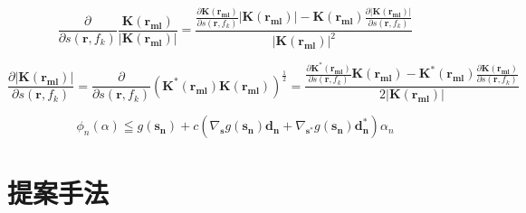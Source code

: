 \documentclass[12pt,a4paper]{jsreport}
\begin{document}

  \begin{equation}
    \frac{\partial}{\partial s(\bm{r},f_{k})} \frac{\bm{K({\bm{r_{ml}}})}}{|\bm{K({\bm{r_{ml}}})}|}
    = \frac{ \frac{\partial \bm{K(\bm{r_{ml}})} }{\partial s(\bm{r},f_{k})}|\bm{K({\bm{r_{ml}}})}|  - 
      \bm{K({\bm{r_{ml}}})}\frac{\partial |\bm{K(\bm{r_{ml}})}| }{\partial s(\bm{r},f_{k})}}{|\bm{K({\bm{r_{ml}}})}|^2}
        \label{正規化hの微分}
    \end{equation}

    \begin{equation}
      \frac{\partial |\bm{K({\bm{r_{ml}}})}|}{\partial s(\bm{r},f_{k})} 
      = \frac{\partial}{\partial s(\bm{r},f_{k})}(\bm{K^{*}({\bm{r_{ml}}})}\bm{K({\bm{r_{ml}}})})^{\frac{1}{2}}
      = \frac{ \frac{\partial \bm{K^{*}(\bm{r_{ml}})} }{\partial s(\bm{r},f_{k})}\bm{K({\bm{r_{ml}}})}  - 
      \bm{K^{*}({\bm{r_{ml}}})}\frac{\partial \bm{K(\bm{r_{ml}})} }{\partial s(\bm{r},f_{k})}}{2|\bm{K({\bm{r_{ml}}})}|}
          \label{絶対値kの微分}
      \end{equation}

  
    \begin{equation}
      \phi_{n}(\alpha) \leqq g(\bm{s_{n}})+c(\nabla_{\bm{s}}g(\bm{s_{n}})\bm{d_{n}}+\nabla_{\bm{s^{*}}}g(\bm{s_{n}})\bm{d^{*}_{n}})\alpha_{n}
          \label{armijocondition}
      \end{equation}  

\chapter{提案手法}
\end{document}
